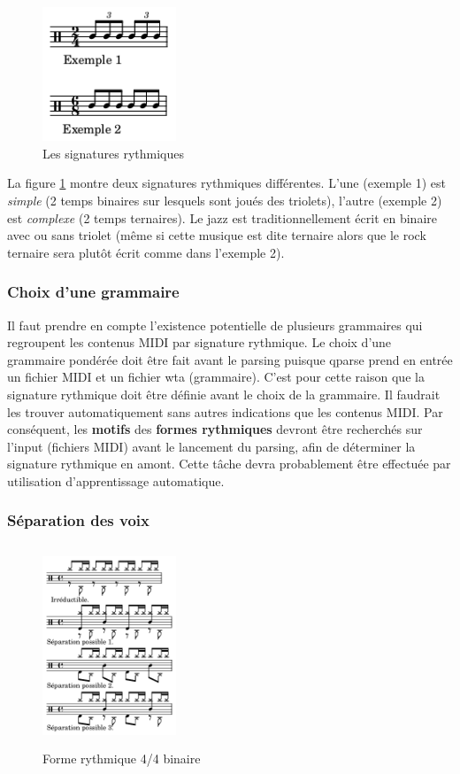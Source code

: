 \begin{figure}[h]
	\centering
	\includegraphics[height=40mm, width=40mm]{
    z_images/3_methodes/2_systemes/0_simple_VS_complexe.png}
	\caption{Les signatures rythmiques}
	\label{subdivisions}
\end{figure} %

La figure \ref{subdivisions} montre deux signatures rythmiques différentes. 
L’une (exemple 1) est \textit{simple} (2 temps binaires sur lesquels sont joués
des triolets), l’autre (exemple 2) est \textit{complexe} (2 temps ternaires). 
Le jazz est traditionnellement écrit en binaire avec ou sans triolet (même si
cette musique est dite ternaire alors que le rock ternaire sera plutôt écrit
comme dans l’exemple 2).

\subsubsection{Choix d’une grammaire}
Il faut prendre en compte l’existence potentielle de plusieurs grammaires
qui regroupent les contenus MIDI par signature rythmique. Le choix d’une
grammaire pondérée doit être fait avant le parsing puisque qparse prend en
entrée un fichier MIDI et un fichier wta (grammaire). C’est pour cette raison
que la signature rythmique doit être définie avant le choix de la grammaire.
Il faudrait les trouver automatiquement sans autres indications que les
contenus MIDI. Par conséquent, les \textbf{motifs} des
\textbf{formes rythmiques} devront être recherchés sur l’input (fichiers MIDI)
avant le lancement du parsing, afin de déterminer la signature rythmique en
amont. Cette tâche devra probablement être effectuée par utilisation
d'apprentissage automatique.


\subsubsection{Séparation des voix}

\label{sys_sep_voix}
\begin{figure}[h]
	\centering
	\includegraphics[height=60mm, width=40mm]{
    z_images/3_methodes/2_systemes/1_separation_4-4_binaire.png}
	\caption{Forme rythmique 4/4 binaire}
	\label{binaire}
\end{figure}


